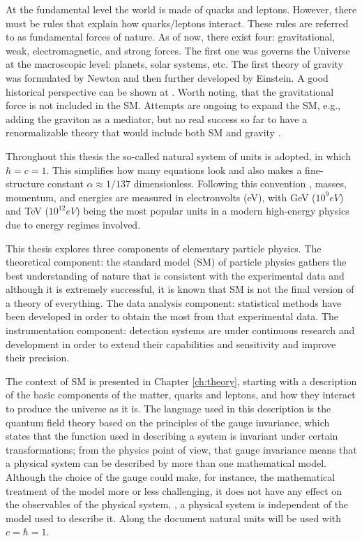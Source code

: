 At the fundamental level the world is made of quarks and leptons. However, there must be rules that explain how quarks/leptons interact. These rules are referred to as fundamental forces of nature. As of now, there exist four: gravitational, weak, electromagnetic, and strong forces. The first one was governs the Universe at the macroscopic level: planets, solar systems, etc. The first theory of gravity was formulated by Newton \cite{Chandrasekhar:1187874} and then further developed by Einstein. A good historical perspective can be shown at \cite{Gutfreund:1980674}. Worth noting, that the gravitational force is not included in the SM. Attempts are ongoing to expand the SM, e.g., adding the graviton as a mediator, but no real success so far to have a renormalizable theory that would include both SM and gravity \cite{butterworth2014smashing}. 



Throughout this thesis the so-called natural system of units is adopted, in which $\hbar = c = 1$. This simplifies how many equations look and also makes a fine-structure constant $\alpha \approx 1/137$ dimensionless.
Following this convention \cite{Cottingham:1026625}, masses, momentum, and energies are measured in electronvolts (eV), with GeV ($10^9 eV$) and TeV ($10^12 eV$) being the most popular units in a modern high-energy physics due to energy regimes involved.






This thesis explores three components of elementary particle physics. The theoretical component: the standard model (SM) of particle physics gathers the best understanding of nature that is consistent with the experimental data and although it is extremely successful, it is known that SM is not the final version of a theory of everything. The data analysis component: statistical methods have been developed in order to obtain the most from that experimental data. The instrumentation component: detection systems are under continuous research and development in order to extend their capabilities and sensitivity and improve their precision. 

The context of SM is presented in Chapter \ref{ch:theory}, starting with a description of the basic components of the matter, quarks and leptons, and how they interact to produce the universe as it is. The language used in this description is the quantum field theory based on the principles of the gauge invariance, which states that the function used in describing a system is invariant under certain transformations; from the physics point of view, that gauge invariance means that a physical system can be described by more than one mathematical model. Although the choice of the gauge could make, for instance, the mathematical treatment of the model more or less challenging, it does not have any effect on the observables of the physical system, \ie, a physical system is independent of the model used to describe it. Along the document natural units will be used with $c=\hbar=1$. 

